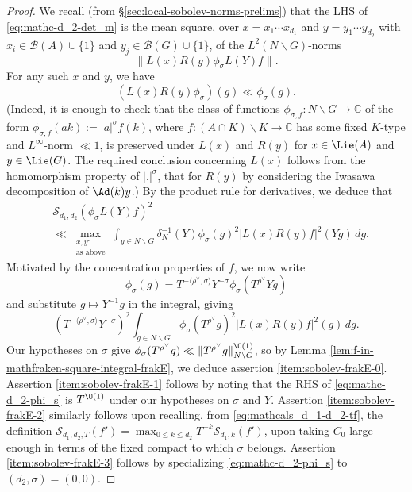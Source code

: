\begin{proof}
  We recall (from \S\ref{sec:local-sobolev-norms-prelims}) that the LHS of \eqref{eq:mathc-d_2-det_m} is the mean square, over $x = x_1 \dotsb x_{d_1}$ and $y = y_1 \dotsb y_{d_2}$ with $x_i \in \mathcal{B}(A) \cup \{1\}$ and $y_j \in \mathcal{B}(G) \cup \{1\}$, of the $L^2(N \backslash G)$-norms
  \begin{equation*}
    \|L(x) R(y) \phi_{\sigma} L(Y) f\|.
  \end{equation*}
  For any such $x$ and $y$, we have
  \begin{equation*}
    \left(
      L(x) R(y) \phi_{\sigma}
    \right)(g)
    \ll \phi_{\sigma}(g).
  \end{equation*}
  (Indeed, it is enough to check that the class of functions $\phi_{\sigma,f} : N \backslash G \rightarrow \mathbb{C}$ of the form $\phi_{\sigma,f}(a k) := |a|^{\sigma} f(k)$, where $f : (A \cap K) \backslash K \rightarrow \mathbb{C}$ has some fixed $K$-type and $L^\infty$-norm $\ll 1$, is preserved under $L(x)$ and $R(y)$ for $x \in \Lie(A)$ and $y \in \Lie(G)$.  The required conclusion concerning $L(x)$ follows from the homomorphism property of $|.|^{\sigma}$, that for $R(y)$ by considering the Iwasawa decomposition of $\Ad(k) y$.)  By the product rule for derivatives, we deduce that
  \begin{align*}
    &\mathcal{S}_{d_1,d_2} (\phi_\sigma  L(Y) f)^2 \\
    &\ll
      \max_{
      \substack{
      x,y:  \\
    \text{as above}
    }
    }
    \int_{g \in N \backslash G}
    \delta_N^{-1}(Y)
    \phi_\sigma(g)^2
    \left\lvert
    L(x) R(y) f
    \right\rvert^2(Y g) \, d g.
  \end{align*}
  Motivated by the concentration properties of $f$, we now write
  \begin{equation*}
    \phi_\sigma(g) = T^{-\langle \rho^\vee, \sigma  \rangle} Y^{-\sigma} \phi_\sigma(T^{\rho^\vee} Y g)
  \end{equation*}
  and substitute $g \mapsto Y^{-1} g$ in the integral, giving
  \begin{equation*}
    (T^{-\langle \rho^\vee, \sigma  \rangle} Y^{-\sigma})^2
    \int_{g \in N \backslash G}
    \phi_{\sigma} (T^{\rho^\vee} g)^2
    \left\lvert
      L(x) R(y) f
    \right\rvert^2(g) \, d g.
  \end{equation*}
  Our hypotheses on $\sigma$ give $\phi_{\sigma} (T^{\rho^\vee} g) \ll \|T^{\rho^\vee} g\|_{N \backslash G}^{\O(1)}$, so by Lemma \ref{lem:f-in-mathfraken-square-integral-frakE}, we deduce assertion \eqref{item:sobolev-frakE-0}.  Assertion \eqref{item:sobolev-frakE-1} follows by noting that the RHS of \eqref{eq:mathc-d_2-phi_s} is $T^{\O(1)}$ under our hypotheses on $\sigma$ and $Y$.  Assertion \eqref{item:sobolev-frakE-2} similarly follows upon recalling, from \eqref{eq:mathcals_d_1-d_2-tf}, the definition $\mathcal{S}_{d_1,d_2,T}(f') = \max_{0 \leq k \leq d_2} T^{-k} \mathcal{S}_{d_1,k}(f')$, upon taking $C_0$ large enough in terms of the fixed compact to which $\sigma$ belongs.  Assertion \eqref{item:sobolev-frakE-3} follows by specializing \eqref{eq:mathc-d_2-phi_s} to $(d_2,\sigma) = (0,0)$.
\end{proof}


